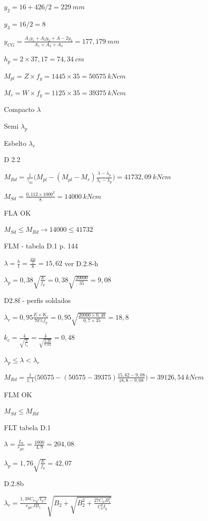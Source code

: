 \begin{enumerate}
    $y_2 = 16+426/2 = 229 \ mm$

    $y_3 = 16/2 = 8$

    $y_{CG} = \frac{A_1y_1+A_2y_2+A-2y_3}{A_1+A_2+A_3} = 177,179 \ mm$

    $h_p=2\times 37,17 = 74,34 \ cm$

    $M_{pl} = Z \times f_y = 1445 \times 35 = 50575 \ kNcm$

    $M_r = W\times f_y = 1125 \times 35 = 39375 \ kNcm$

    Compacto $\lambda$

    Semi $\lambda_p$

    Esbelto $\lambda_r$

    D 2.2

    $M_{Rd} = \frac{1}{\gamma_{a1}}\Big(M_{pl}-(M_{pl}-M_r)\frac{\lambda-\lambda_p}{\lambda_r-\lambda_p} \Big) = 41732,09 \ kNcm$

    $M_{Sd} = \frac{0,112 \times 1000^2}{8}= 14000\ kNcm$

    FLA OK

    $M_{Sd}\leq M_{Rd} \to 14000 \leq 41732$

    FLM - tabela D.1 p. 144

    $\lambda = \frac{b}{t} = \frac{\frac{250}{2}}{8} = 15,62$ ver D.2.8-h

    $\lambda_p = 0,38 \sqrt{\frac{E}{f_y}} = 0,38 \sqrt{\frac{20000}{35}}=9,08$

    D2.8f - perfis soldados

    $\lambda_r = 0,95 \frac{E \times K_c}{70\%f_y}= 0,95 \sqrt{\frac{20000\times 0,48}{0,7 \times 35}} = 18,8$

    $k_c = \frac{4}{\sqrt{\frac{h}{t_w}}} = \frac{4}{\sqrt{\frac{4,26}{0,63}}}=0,48$

    $\lambda_p \leq \lambda < \lambda_r$

    $M_{Rd} = \frac{1}{1,1}\Big(50575 -(50575 - 39375) \frac{15,62-9,08}{18,8-9,08} \Big)=39126,54 \ kNcm$

    FLM OK 

    $M_{Sd}\leq M_{Rd}$

    FLT tabela D.1

    $\lambda = \frac{L_b}{r_{ytc}} = \frac{1000}{4,9} = 204,08$

    $\lambda_p = 1,76 \sqrt{\frac{E}{f_y}} = 42,07$

    D.2.8b

    $\lambda_r=\frac{1,38C_b\sqrt{I_yJ}}{r_{ytc}JB_1}\sqrt{B_2+\sqrt{B^2_2+\frac{27C_wB_1^2}{C_b^2I_y}}}$


\end{enumerate}
